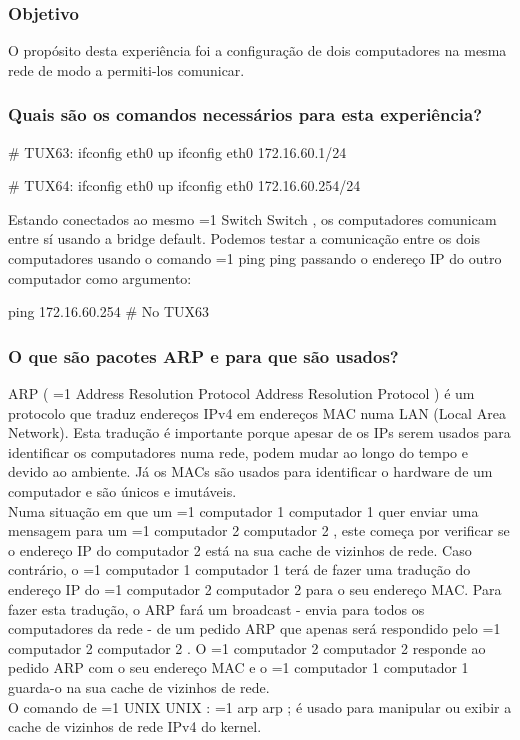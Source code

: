 \documentclass[11pt,a4paper,twocolumn]{article}
\newcommand{\hl}[2][1]{%
  \ifnum#1=1\relax
    \textcolor{text-hl1}{#2}%
  \else
    \textcolor{text-hl2}{#2}%
  \fi
}
\begin{document}
\subsubsection{Objetivo}

O propósito desta experiência foi a configuração de dois computadores na mesma rede de modo a permiti-los comunicar.

\subsubsection{Quais são os comandos necessários para esta experiência?}

\begin{bash-darktheme}
    # TUX63:
    ifconfig eth0 up
    ifconfig eth0 172.16.60.1/24

    # TUX64:
    ifconfig eth0 up
    ifconfig eth0 172.16.60.254/24
\end{bash-darktheme}
 
Estando conectados ao mesmo \hl{Switch}, os computadores comunicam entre sí usando a bridge default. Podemos testar a comunicação entre os dois computadores usando o comando \hl{ping} passando o endereço IP do outro computador como argumento: 

\begin{bash-darktheme}
    ping 172.16.60.254 # No TUX63
\end{bash-darktheme}

\subsubsection{O que são pacotes ARP e para que são usados?}

ARP (\hl{Address Resolution Protocol}) é um protocolo que traduz endereços IPv4 em endereços MAC numa LAN (Local Area Network). Esta tradução é importante porque apesar de os IPs serem usados para identificar os computadores numa rede, podem mudar ao longo do tempo e devido ao ambiente. Já os MACs são usados para identificar o hardware de um computador e são únicos e imutáveis. \\
Numa situação em que um \hl[2]{computador 1} quer enviar uma mensagem para um \hl[2]{computador 2}, este começa por verificar se o endereço IP do computador 2 está na sua cache de vizinhos de rede. Caso contrário, o \hl[2]{computador 1} terá de fazer uma tradução do endereço IP do \hl[2]{computador 2} para o seu endereço MAC. Para fazer esta tradução, o ARP fará um broadcast - envia para todos os computadores da rede - de um pedido ARP que apenas será respondido pelo \hl[2]{computador 2}. O \hl[2]{computador 2} responde ao pedido ARP com o seu endereço MAC e o \hl[2]{computador 1} guarda-o na sua cache de vizinhos de rede. \\
O comando de \hl[2]{UNIX}: \hl{arp}; é usado para manipular ou exibir a cache de vizinhos de rede IPv4 do kernel.
\end{document}
